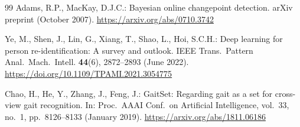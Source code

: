 \documentclass[runningheads]{llncs}
\begin{document}
\begin{thebibliography}{99}
Adams, R.P., MacKay, D.J.C.: Bayesian online changepoint detection. arXiv preprint (October 2007). \url{https://arxiv.org/abs/0710.3742}

Ye, M., Shen, J., Lin, G., Xiang, T., Shao, L., Hoi, S.C.H.: Deep learning for person re-identification: A survey and outlook. IEEE Trans.\ Pattern Anal.\ Mach.\ Intell. \textbf{44}(6), 2872--2893 (June 2022). \url{https://doi.org/10.1109/TPAMI.2021.3054775}

Chao, H., He, Y., Zhang, J., Feng, J.: GaitSet: Regarding gait as a set for cross-view gait recognition. In: Proc.\ AAAI Conf.\ on Artificial Intelligence, vol.\ 33, no.\ 1, pp.\ 8126--8133 (January 2019). \url{https://arxiv.org/abs/1811.06186}

\end{thebibliography}
\end{document}
